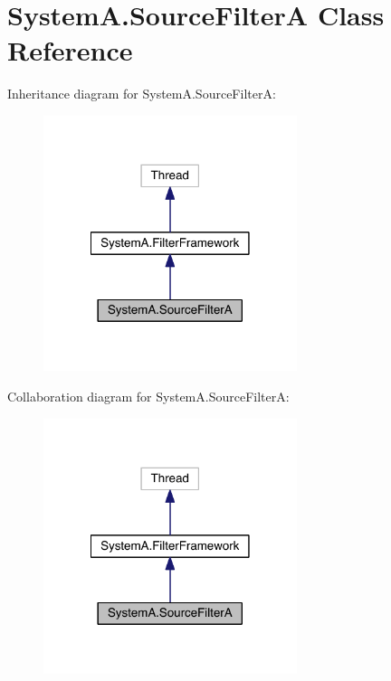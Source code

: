\hypertarget{class_system_a_1_1_source_filter_a}{}\section{System\+A.\+Source\+Filter\+A Class Reference}
\label{class_system_a_1_1_source_filter_a}


Inheritance diagram for System\+A.\+Source\+Filter\+A\+:\nopagebreak
\begin{figure}[H]
\begin{center}
\leavevmode
\includegraphics[width=210pt]{class_system_a_1_1_source_filter_a__inherit__graph}
\end{center}
\end{figure}


Collaboration diagram for System\+A.\+Source\+Filter\+A\+:\nopagebreak
\begin{figure}[H]
\begin{center}
\leavevmode
\includegraphics[width=210pt]{class_system_a_1_1_source_filter_a__coll__graph}
\end{center}
\end{figure}

